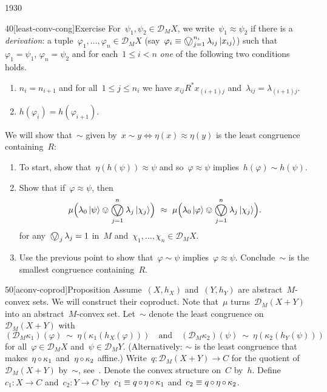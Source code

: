 \begin{parsec}{1930}
\begin{point}{40}[least-conv-cong]{Exercise}
For~$\psi_1,\psi_2 \in \mathcal{D}_M X$,
    we write~$\psi_1 \approx \psi_2$
    if there is a \emph{derivation}: a tuple~$\varphi_1, \ldots, \varphi_n \in \mathcal{D}_M X$
(say~$\varphi_i \equiv \bigovee^{n_i}_{j = 1}  \lambda_{ij}\ket{x_{ij}}$)
such that~$\varphi_1 = \psi_1$, $\varphi_n = \psi_2$ 
    and for each~$1 \leq i<n$ \emph{one} of the following two conditions holds.
\begin{enumerate}
\item
    $n_i = n_{i+1}$
    and for all~$1 \leq j \leq n_i$ we have
    $x_{ij} \mathrel{R^*} x_{(i+1)j}$
    and~$\lambda_{ij}  = \lambda_{(i+1)j}$.
\item
    $h (\varphi_i) = h(\varphi_{i+1})$.
\end{enumerate}
We will show that~$\sim$
    given by~$x \sim y \iff \eta (x) \approx \eta(y)$
    is the least congruence containing~$R$:
\begin{enumerate}
\item
To start, show that~$\eta ( h(\psi)) \approx \psi $
    and so~$\varphi \approx \psi$ implies~$h(\varphi) \sim h(\psi)$.
\item
Show that if~$\varphi \approx \psi$,
    then
    \begin{equation*}
    \mu \Bigl(\lambda_0 \ket{\psi} \ovee \bigovee_{j=1}^n \lambda_j \ket{\chi_j}\Bigr)
    \ \approx  \ 
    \mu \Bigl(\lambda_0 \ket{\varphi} \ovee \bigovee_{j=1}^n \lambda_j \ket{\chi_j}\Bigr).
    \end{equation*}
    for any~$\bigovee_j \lambda_j=1$  in~$M$ and~$\chi_1,\ldots, \chi_n \in \mathcal{D}_M X$.
\item
    Use the previous point to show that~$\varphi \sim \psi$
        implies~$\varphi \approx \psi$.
Conclude~$\sim$ is the smallest congruence containing~$R$.
\end{enumerate}
\end{point}
\begin{point}{50}[aconv-coprod]{Proposition}%
Assume~$(X,h_X)$ and~$(Y,h_Y)$
    are abstract~$M$-convex sets.
    We will construct their coproduct.
Note that~$\mu$ turns~$\mathcal{D}_M (X+Y)$
    into an abstract~$M$-convex set.
Let~$\sim$ denote the least congruence on~$\mathcal{D}_M (X+Y)$
with
\begin{equation}
    (\mathcal{D}_M \kappa_1) (\varphi)
    \ \sim \ \eta(\kappa_1 ( h_X (\varphi)))
    \quad \text{and} \quad
    (\mathcal{D}_M \kappa_2) (\psi)
    \ \sim \ \eta(\kappa_2 ( h_Y (\psi))) \label{congruence-coprod-conv}
\end{equation}
    for all~$\varphi \in \mathcal{D}_M X$
    and~$\psi \in \mathcal{D}_M Y$.
(Alternatively: $\sim$ is the least congruence
    that makes~$\eta \mathop{\circ} \kappa_1$ and~$\eta\mathop{\circ}\kappa_2$ affine.)
Write~$q\colon \mathcal{D}_M (X+Y) \to C$
    for the quotient of~$\mathcal{D}_M(X+Y)$ by~$\sim$, see~.
    Denote the convex structure on~$C$ by~$h$.
Define~$c_1 \colon X \to C$ and~$c_2 \colon Y \to C$
    by~$c_1 \equiv q \mathop{\circ} \eta \mathop{\circ} \kappa_1$
    and~$c_2 \equiv q \mathop{\circ} \eta \mathop{\circ} \kappa_2$.


\end{point}
\end{parsec}
